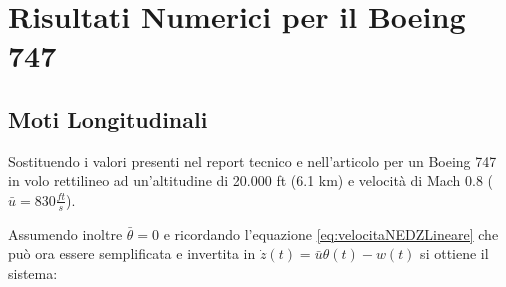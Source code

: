 
\section{Risultati Numerici per il Boeing 747}

\subsection{Moti Longitudinali}
Sostituendo i valori presenti nel report tecnico \cite{heffley_handling_qualities} e nell'articolo \cite{sanches_dynamic_stability_747} per un Boeing 747 in volo rettilineo ad un'altitudine di 20.000 ft (6.1 km) e velocità di Mach 0.8 ($\bar{u} = 830 \frac{ft}{s}$).

Assumendo inoltre $\bar{\theta} = 0$ e ricordando l'equazione \eqref{eq:velocitaNEDZLineare} che può ora essere semplificata e invertita in $\dot{z}(t) = \bar{u}\theta(t) - w(t)$ si ottiene il sistema:

